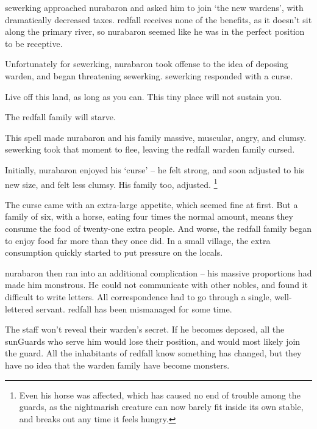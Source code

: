 \label{desperatemeasures}


\begin{exampletext}
  \Gls{sewerking} approached \gls{nurabaron} and asked him to join `the new \glspl{warden}', with dramatically decreased taxes.
  \Gls{redfall} receives none of the benefits, as it doesn't sit along the primary river, so \gls{nurabaron} seemed like he was in the perfect position to be receptive.

  Unfortunately for \gls{sewerking}, \gls{nurabaron} took offense to the idea of deposing \gls{warden}, and began threatening \gls{sewerking}.
  \Gls{sewerking} responded with a curse.

  \begin{speechtext}
    Live off this land, as long as you can.
    This tiny place will not sustain you.

    The \gls{redfall} family will starve.

  \end{speechtext}
  This spell made \gls{nurabaron} and his family massive, muscular, angry, and clumsy.
  \Gls{sewerking} took that moment to flee, leaving the \gls{redfall} \gls{warden} family cursed.

  Initially, \gls{nurabaron} enjoyed his `curse' -- he felt strong, and soon adjusted to his new size, and felt less clumsy.
  His family too, adjusted.%
  \footnote{Even his horse was affected, which has caused no end of trouble among the guards, as the nightmarish creature can now barely fit inside its own stable, and breaks out any time it feels hungry.}

  The curse came with an extra-large appetite, which seemed fine at first.
  But a family of six, with a horse, eating four times the normal amount, means they consume the food of twenty-one extra people.
  And worse, the \gls{redfall} family began to enjoy food far more than they once did.
  In a small \gls{village}, the extra consumption quickly started to put pressure on the locals.

  \Gls{nurabaron} then ran into an additional complication -- his massive proportions had made him monstrous.
  He could not communicate with other nobles, and found it difficult to write letters.
  All correspondence had to go through a single, well-lettered servant.
  \Gls{redfall} has been mismanaged for some time.

  The staff won't reveal their \gls{warden}'s secret.
  If he becomes deposed, all the \glspl{sunGuard} who serve him would lose their position, and would most likely join the \gls{guard}.
  All the inhabitants of \gls{redfall} know something has changed, but they have no idea that the \gls{warden} family have become monsters.
\end{exampletext}

